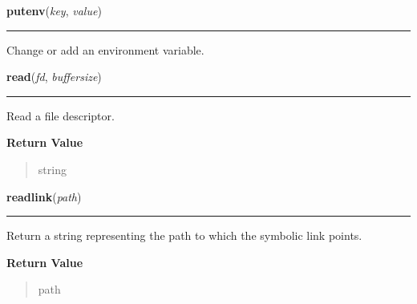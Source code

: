 \hspace{.8\funcindent}\begin{boxedminipage}{\funcwidth}

    \raggedright \textbf{putenv}(\textit{key}, \textit{value})

    \vspace{-1.5ex}

    \rule{\textwidth}{0.5\fboxrule}
\setlength{\parskip}{2ex}
    Change or add an environment variable.

\setlength{\parskip}{1ex}
    \end{boxedminipage}

    \label{os:read}

    \vspace{0.5ex}

\hspace{.8\funcindent}\begin{boxedminipage}{\funcwidth}

    \raggedright \textbf{read}(\textit{fd}, \textit{buffersize})

    \vspace{-1.5ex}

    \rule{\textwidth}{0.5\fboxrule}
\setlength{\parskip}{2ex}
    Read a file descriptor.

\setlength{\parskip}{1ex}
      \textbf{Return Value}
    \vspace{-1ex}

      \begin{quote}
      string

      \end{quote}

    \end{boxedminipage}

    \label{os:readlink}

    \vspace{0.5ex}

\hspace{.8\funcindent}\begin{boxedminipage}{\funcwidth}

    \raggedright \textbf{readlink}(\textit{path})

    \vspace{-1.5ex}

    \rule{\textwidth}{0.5\fboxrule}
\setlength{\parskip}{2ex}
    Return a string representing the path to which the symbolic link 
    points.

\setlength{\parskip}{1ex}
      \textbf{Return Value}
    \vspace{-1ex}

      \begin{quote}
      path

      \end{quote}

    \end{boxedminipage}

